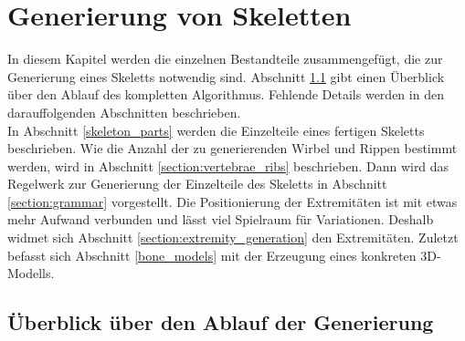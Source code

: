 \chapter{Generierung von Skeletten}
\label{chapter:skeleton_generation}

In diesem Kapitel werden die einzelnen Bestandteile zusammengefügt, die zur Generierung eines Skeletts notwendig sind. 
Abschnitt \ref{section:overview} gibt einen Überblick über den Ablauf des kompletten Algorithmus. Fehlende Details werden in den darauffolgenden Abschnitten beschrieben.\\
In Abschnitt \ref{skeleton_parts} werden die Einzelteile eines fertigen Skeletts beschrieben. 
Wie die Anzahl der zu generierenden Wirbel und Rippen bestimmt werden, wird in Abschnitt \ref{section:vertebrae_ribs} beschrieben.
Dann wird das Regelwerk zur Generierung der Einzelteile des Skeletts in Abschnitt \ref{section:grammar} vorgestellt. Die Positionierung der Extremitäten ist mit etwas mehr Aufwand verbunden und lässt viel Spielraum für Variationen. Deshalb widmet sich Abschnitt \ref{section:extremity_generation} den Extremitäten. 
Zuletzt befasst sich Abschnitt \ref{bone_models} mit der Erzeugung eines konkreten 3D-Modells.


\section{Überblick über den Ablauf der Generierung}
\label{section:overview}

